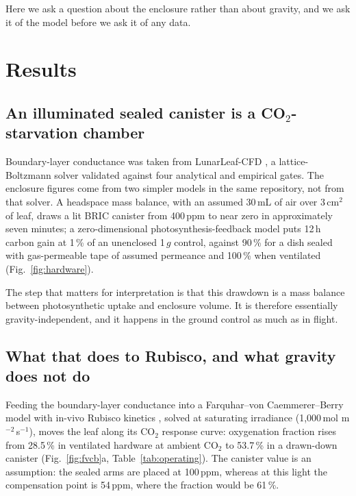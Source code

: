\documentclass[pdflatex,sn-nature]{sn-jnl}
\begin{document}
Here we ask a question about the enclosure rather than about gravity, and we ask it of the
model before we ask it of any data.

\section{Results}\label{sec:results}

\subsection{An illuminated sealed canister is a CO\texorpdfstring{$_2$}{2}-starvation chamber}

Boundary-layer conductance was taken from LunarLeaf-CFD \citep{lunarleaf}, a
lattice-Boltzmann solver validated against four analytical and empirical gates. The enclosure
figures come from two simpler models in the same repository, not from that solver. A
headspace mass balance, with an assumed 30\,mL of air over 3\,cm$^2$ of leaf, draws a lit BRIC
canister from 400\,ppm to near zero in approximately seven minutes; a zero-dimensional
photosynthesis-feedback model puts 12\,h carbon gain at 1\,\% of an unenclosed 1\,$g$ control,
against 90\,\% for a dish sealed with gas-permeable tape of assumed permeance and 100\,\% when
ventilated (Fig.~\ref{fig:hardware}).

The step that matters for interpretation is that this drawdown is a mass balance between
photosynthetic uptake and enclosure volume. It is therefore essentially gravity-independent,
and it happens in the ground control as much as in flight.

\subsection{What that does to Rubisco, and what gravity does not do}

Feeding the boundary-layer conductance into a Farquhar--von Caemmerer--Berry model
\citep{farquhar1980} with in-vivo Rubisco kinetics \citep{bernacchi2001,bernacchi2003}, solved
at saturating irradiance (1{,}000\,\textmu mol m$^{-2}$\,s$^{-1}$), moves
the leaf along its CO$_2$ response curve: oxygenation fraction rises from
28.5\,\% in ventilated hardware at ambient CO$_2$ to 53.7\,\% in a drawn-down canister
(Fig.~\ref{fig:fvcb}a, Table~\ref{tab:operating}). The canister value is an assumption: the
sealed arms are placed at 100\,ppm, whereas at this light the compensation point is 54\,ppm,
where the fraction would be 61\,\%.
\end{document}
